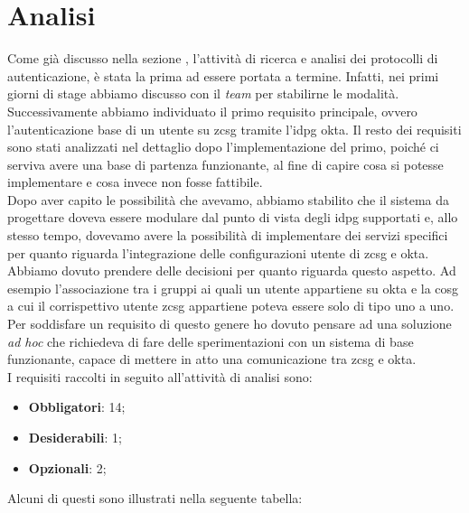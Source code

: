 \section{Analisi}
Come già discusso nella sezione , l'attività di ricerca e analisi dei protocolli di autenticazione, è stata la prima ad essere portata a termine. Infatti, nei primi giorni di stage abbiamo discusso con il \textit{team} per stabilirne le modalità. Successivamente abbiamo individuato il primo requisito principale, ovvero l'autenticazione base di un utente su \gls{zcsg} tramite l'\gls{idpg} \gls{okta}. Il resto dei requisiti sono stati analizzati nel dettaglio dopo l'implementazione del primo, poiché ci serviva avere una base di partenza funzionante, al fine di capire cosa si potesse implementare e cosa invece non fosse fattibile. \\
Dopo aver capito le possibilità che avevamo, abbiamo stabilito che il sistema da progettare doveva essere modulare dal punto di vista degli \gls{idpg} supportati e, allo stesso tempo, dovevamo avere la possibilità di implementare dei servizi specifici per quanto riguarda l'integrazione delle configurazioni utente di \gls{zcsg} e \gls{okta}. Abbiamo dovuto prendere delle decisioni per quanto riguarda questo aspetto. Ad esempio l'associazione tra i gruppi ai quali un utente appartiene su \gls{okta} e la \gls{cosg} a cui il corrispettivo utente \gls{zcsg} appartiene poteva essere solo di tipo uno a uno. Per soddisfare un requisito di questo genere ho dovuto pensare ad una soluzione \textit{ad hoc} che richiedeva di fare delle sperimentazioni con un sistema di base funzionante, capace di mettere in atto una comunicazione tra \gls{zcsg} e \gls{okta}. \\
I requisiti raccolti in seguito all'attività di analisi sono:
\begin{itemize}
    \setlength\itemsep{0em}
    \item \textbf{Obbligatori}: 14;
    \item \textbf{Desiderabili}: 1;
    \item \textbf{Opzionali}: 2;
\end{itemize}
 
Alcuni di questi sono illustrati nella seguente tabella:

